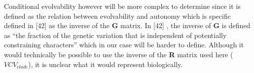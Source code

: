 \documentclass[12pt,a4paper]{article}
\begin{document}
Conditional evolvability however will be more complex to determine since it is defined as the relation between evolvability and autonomy which is specific defined in [42] %
 as the inverse of the \textbf{G} matrix.
In [42] %
, the inverse of \textbf{G} is defined as ``the fraction of the genetic variation that is independent of potentially constraining characters'' which in our case will be harder to define.
Although it would technically be possible to use the inverse of the \textbf{R} matrix used here ($VCV_{clade}$), it is unclear what it would represent biologically.

%
%

% 
% 
\end{document}
